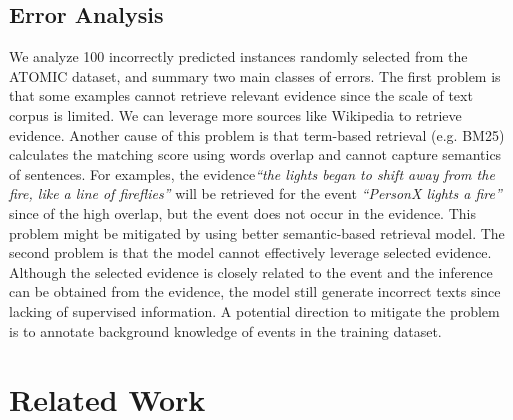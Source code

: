 \documentclass[11pt,a4paper]{article}
\begin{document}
\subsection{Error Analysis}
We analyze 100 incorrectly predicted instances randomly selected from the ATOMIC dataset, and summary two main classes of errors.
The first problem is that some examples cannot retrieve relevant evidence since the scale of text corpus is limited. We can leverage more sources like Wikipedia to retrieve evidence. 
Another cause of this problem is that term-based retrieval (e.g. BM25) calculates the matching score using words overlap and cannot capture semantics of sentences. For examples, the evidence\textit{``the lights began to shift away from the fire, like a line of fireflies''} will be retrieved for the event  \textit{``PersonX lights a fire''} since of the high overlap, but the event does not occur in the evidence.
This problem might be mitigated by using better semantic-based retrieval model.
The second problem is that the model cannot effectively leverage selected evidence. Although the selected evidence is closely related to the event and the inference can be obtained from the evidence, the model still generate incorrect texts since lacking of supervised information.  
A potential direction to mitigate the problem is to annotate background knowledge of events in the training dataset. 







\section{Related Work}
\end{document}
